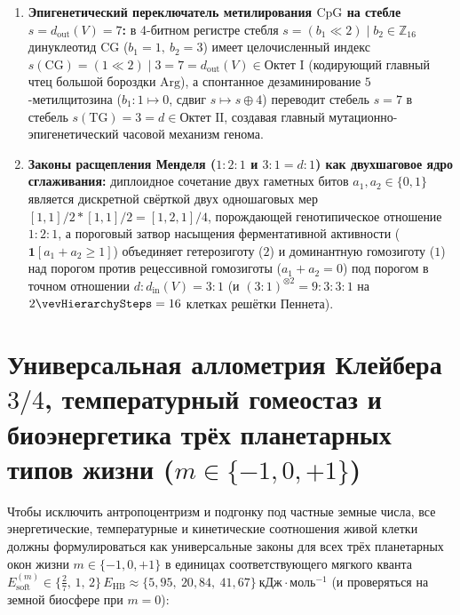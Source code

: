 \begin{theorem}[Законы Чаргаффа, спектр мутаций $7/8$ и $15/16$, эпигенетический стебель $\mathrm{CpG}=7$ и расщепление Менделя]
\begin{enumerate}[leftmargin=*]
  \begin{equation}
  \label{eq:bio-synonymous-transition-fractions}
  \begin{aligned}
    f_{\mathrm{stems}}(\mathrm{Ti}_3) &= \frac{2d_{\mathrm{out}}(V)}{2\vevHierarchySteps} = \frac{14}{16} = \frac{7}{8} = 87{,}5\%,\\
    f_{\mathrm{codons}}(\mathrm{Ti}_3) &= \frac{d_{\mathrm{out}}(E)\geomNeighborTwelve}{2^{\mathrm{frac\_bits}}} = \frac{60}{64} = \frac{15}{16} = 93{,}75\%.
  \end{aligned}
  \end{equation}
\item \textbf{Эпигенетический переключатель метилирования $\mathrm{CpG}$ на стебле $s = d_{\mathrm{out}}(V) = 7$:}
  в 4-битном регистре стебля $s = (b_1\ll 2)\mid b_2 \in \mathbb{Z}_{16}$ динуклеотид $\text{CG}$ ($b_1=1,\ b_2=3$) имеет целочисленный индекс $s(\text{CG}) = (1\ll 2)\mid 3 = 7 = d_{\mathrm{out}}(V) \in \text{Октет I}$ (кодирующий главный чтец большой бороздки $\text{Arg}$), а спонтанное дезаминирование $5$-метилцитозина ($b_1\colon 1\mapsto 0$, сдвиг $s\mapsto s\oplus 4$) переводит стебель $s=7$ в стебель $s(\text{TG}) = 3 = d \in \text{Октет II}$, создавая главный мутационно-эпигенетический часовой механизм генома.
\item \textbf{Законы расщепления Менделя ($1:2:1$ и $3:1 = d:1$) как двухшаговое ядро сглаживания:}
  диплоидное сочетание двух гаметных битов $a_1,a_2\in\{0,1\}$ является дискретной свёрткой двух одношаговых мер $[1,1]/2 * [1,1]/2 = [1,2,1]/4$, порождающей генотипическое отношение $1:2:1$, а пороговый затвор насыщения ферментативной активности ($\mathbf{1}[a_1 + a_2 \ge 1]$) объединяет гетерозиготу ($2$) и доминантную гомозиготу ($1$) над порогом против рецессивной гомозиготы ($a_1+a_2=0$) под порогом в точном отношении $d : d_{\mathrm{in}}(V) = 3 : 1$ (и $(3:1)^{\otimes 2} = 9:3:3:1$ на $2\vevHierarchySteps = 16$ клетках решётки Пеннета).
\end{enumerate}
\end{theorem}

\section{Универсальная аллометрия Клейбера \texorpdfstring{$3/4$}{3/4}, температурный гомеостаз и биоэнергетика трёх планетарных типов жизни (\texorpdfstring{$m\in\{-1,0,+1\}$}{m in {-1,0,+1}})}
\label{sec:bio-allometry-atp-kinetics}

Чтобы исключить антропоцентризм и подгонку под частные земные числа, все энергетические, температурные и кинетические соотношения живой клетки должны формулироваться как универсальные законы для всех трёх планетарных окон жизни $m\in\{-1,0,+1\}$ в единицах соответствующего мягкого кванта $E_{\mathrm{soft}}^{(m)} \in \bigl\{\frac{2}{7},\, 1,\, 2\bigr\}\,E_{\mathrm{HB}} \approx \{5{,}95,\ 20{,}84,\ 41{,}67\}\ \text{кДж}\cdot\text{моль}^{-1}$ (и проверяться на земной биосфере при $m=0$):


